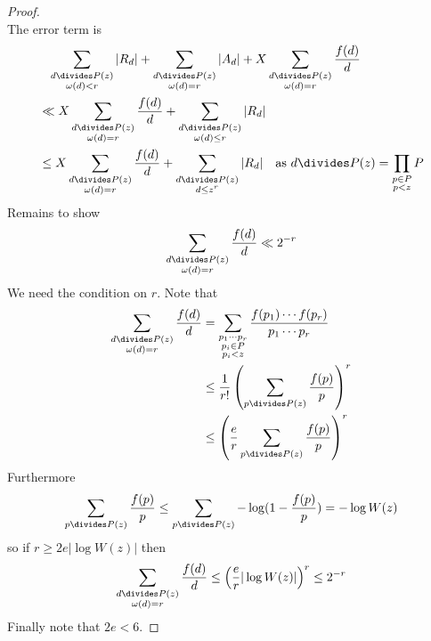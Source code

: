 \documentclass[a4paper]{article}
\theoremstyle{definition}
\begin{document}
\begin{proof}
\[  \]
  The error term is
  \begin{align*}
    &\phantom{=} \sum_{\substack{d \divides P(z) \\ \omega(d) < r}} |R_d| + \sum_{\substack{d \divides P(z) \\ \omega(d) = r}} |A_d| + X \sum_{\substack{d \divides P(z) \\ \omega(d) = r}} \frac{f(d)}{d} \\
    &\ll X \sum_{\substack{d \divides P(z) \\ \omega(d) = r}} \frac{f(d)}{d} + \sum_{\substack{d \divides P(z) \\ \omega(d) \leq r}} |R_d| \\
    &\leq X \sum_{\substack{d \divides P(z) \\ \omega(d) = r}} \frac{f(d)}{d} +\sum_{\substack{d \divides P(z) \\ d \leq z^r}} |R_d| \quad \text{as }
    d \divides P(z) = \prod_{\substack{p \in P \\ p < z}} P
  \end{align*}
  Remains to show
  \[
    \sum_{\substack{d \divides P(z) \\\omega(d) = r}} \frac{f(d)}{d} \ll 2^{-r}
  \]
  We need the condition on \(r\). Note that
  \begin{align*}
    \sum_{\substack{d \divides P(z) \\\omega(d) = r}} \frac{f(d)}{d}
    &= \sum_{\substack{p_1 \cdots p_r \\ p_i \in P \\ p_i < z}} \frac{f(p_1) \cdots f(p_r)}{p_1 \cdots p_r} \\
    &\leq \frac{1}{r!} \left( \sum_{p \divides P(z)} \frac{f(p)}{p} \right)^r \\
    &\leq \left( \frac{e}{r} \sum_{p \divides P(z)} \frac{f(p)}{p} \right)^r \\
  \end{align*}
  Furthermore
  \[
    \sum_{p \divides P(z)} \frac{f(p)}{p}
    \leq \sum_{p \divides P(z)} - \log(1 - \frac{f(p)}{p})
    = - \log W(z)
  \]
  so if \(r \geq 2 e |\log W(z)|\) then
  \[
    \sum_{\substack{d \divides P(z) \\\omega(d) = r}} \frac{f(d)}{d}
    \leq \left( \frac{e}{r} |\log W(z)| \right)^r
    \leq 2^{-r}
  \]
  Finally note that \(2e < 6\).
\end{proof}
\end{document}
